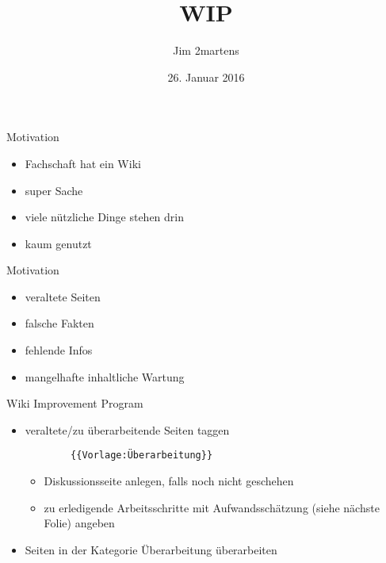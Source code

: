 \documentclass{beamer}
\begin{document}
\author{Jim 2martens}
\title{WIP}
\date{26. Januar 2016}

\begin{frame}
  \titlepage
\end{frame}

\begin{frame}{Motivation}
  \begin{itemize}
    \item Fachschaft hat ein Wiki
    \item super Sache
    \item viele nützliche Dinge stehen drin
    \item kaum genutzt
  \end{itemize}
\end{frame}

\begin{frame}{Motivation}
  \begin{itemize}
    \item veraltete Seiten
    \item falsche Fakten
    \item fehlende Infos
    \item mangelhafte inhaltliche Wartung
  \end{itemize}
\end{frame}

\begin{frame}[fragile]{Wiki Improvement Program}
  \begin{itemize}
    \item veraltete/zu überarbeitende Seiten taggen
      \begin{verbatim}
        {{Vorlage:Überarbeitung}}
      \end{verbatim}
      \begin{itemize}
        \item Diskussionsseite anlegen, falls noch nicht geschehen
        \item zu erledigende Arbeitsschritte mit Aufwandsschätzung (siehe nächste Folie) angeben
      \end{itemize}
    \item Seiten in der Kategorie Überarbeitung überarbeiten
  \end{itemize} 
\end{frame}
\end{document}
